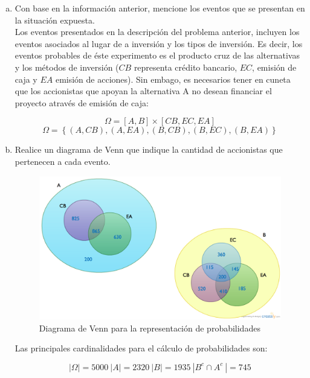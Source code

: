 \documentclass[11pt, spanish]{article}
\begin{document}
\begin{enumerate}[(a)]

\item Con base en la información anterior, mencione los eventos que se presentan en la situación expuesta.\\

Los eventos presentados en la descripción del problema anterior, incluyen los eventos asociados al lugar de a inversión y los tipos de inversión. Es decir, los eventos probables de éste experimento es el producto cruz de las alternativas y los métodos de inversión ($CB$ representa crédito bancario, $EC$, emisión de caja y $EA$ emisión de acciones). Sin embago, es necesarios tener en cuneta que los accionistas que apoyan la alternativa A no desean financiar el proyecto através de emisión de caja:

$$\Omega = \left[A, B \right] \times \left[CB, EC, EA \right]$$
$$\Omega = \left\{ (A, CB), (A, EA), (B, CB), (B, EC), (B, EA)\right\}$$

\pagebreak

\item Realice un diagrama de Venn que indique la cantidad de accionistas que pertenecen a cada evento.\\

\begin{figure}[h]
\centering
	\includegraphics[scale=0.3]{venn_diagram.png}
	\caption{Diagrama de Venn para la representación de probabilidades}
\end{figure}

Las principales cardinalidades para el cálculo de probabilidades son:

$$\left| \Omega \right| = 5000\ \left| A \right| = 2320\ \left| B \right| = 1935\ \left| B^{c} \cap A^{c} \ \right| = 745$$


\end{enumerate}
\end{document}
